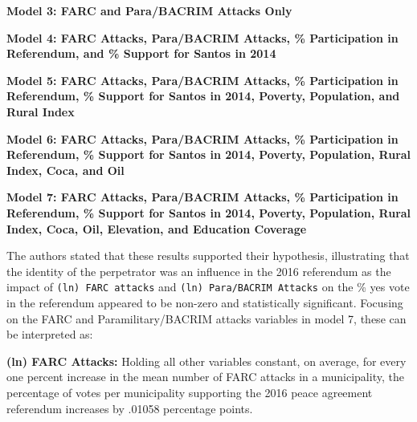\documentclass[12pt,letterpaper]{article}
\begin{document}
	
	
	\noindent\textbf{Model 3: FARC and Para/BACRIM Attacks Only}
	
	
	
	\noindent\textbf{Model 4: FARC Attacks, Para/BACRIM Attacks, \% Participation in Referendum, and \% Support for Santos in 2014}
	
	
	
	\noindent\textbf{Model 5: FARC Attacks, Para/BACRIM Attacks, \% Participation in Referendum, \% Support for Santos in 2014, Poverty, Population, and Rural Index}
	
	
	
	\noindent\textbf{Model 6: FARC Attacks, Para/BACRIM Attacks, \% Participation in Referendum, \% Support for Santos in 2014, Poverty, Population, Rural Index, Coca, and Oil}

	

	\noindent\textbf{Model 7: FARC Attacks, Para/BACRIM Attacks, \% Participation in Referendum, \% Support for Santos in 2014, Poverty, Population, Rural Index, Coca, Oil, Elevation, and Education Coverage}
	
		
	
	
	
	
	
	The authors stated that these results supported their hypothesis, illustrating that the identity of the perpetrator was an influence in the 2016 referendum as the impact of \texttt{(ln) FARC attacks} and \texttt{(ln) Para/BACRIM Attacks} on the \% yes vote in the referendum appeared to be non-zero and statistically significant. Focusing on the FARC and Paramilitary/BACRIM attacks variables in model 7, these can be interpreted as:
	
	\textbf{(ln) FARC Attacks:} Holding all other variables constant, on average, for every one percent increase in the mean number of FARC attacks in a municipality, the percentage of votes per municipality supporting the 2016 peace agreement referendum increases by .01058 percentage points.
	
\end{document}
